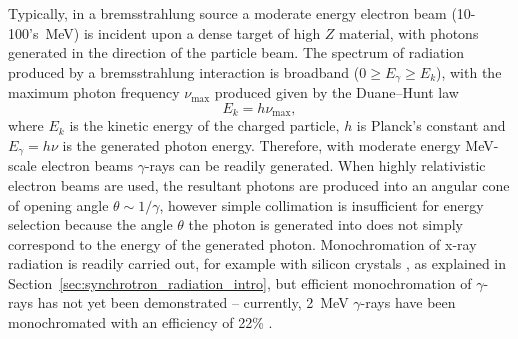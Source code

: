 \documentclass[../main.tex]{subfiles}
\begin{document}
Typically, in a bremsstrahlung source a moderate energy electron beam (10-100's~\si{\mega\electronvolt}) is incident upon a dense target of high $Z$ material, with photons generated in the direction of the particle beam. The spectrum of radiation produced by a bremsstrahlung interaction is broadband ($0 \geq E_{\gamma} \geq E_{k}$), with the maximum photon frequency $\nu_{\mathrm{max}}$ produced given by the Duane--Hunt law \cite{duane1915proceedings}
\begin{equation}
E_{k}=h\nu_{\mathrm{max}},
\label{eq:duane_hunt_intro}
\end{equation}
where $E_{k}$ is the kinetic energy of the charged particle, $h$ is Planck's constant and $E_{\gamma}=h\nu$ is the generated photon energy. Therefore, with moderate energy \si{\mega\electronvolt}-scale electron beams $\gamma$-rays can be readily generated. When highly relativistic electron beams are used, the resultant photons are produced into an angular cone of opening angle $\theta\sim 1/\gamma$, however simple collimation is insufficient for energy selection because the angle $\theta$ the photon is generated into does not simply correspond to the energy of the generated photon. Monochromation of x-ray radiation is readily carried out, for example with silicon crystals , as explained in Section~\ref{sec:synchrotron_radiation_intro}, but efficient monochromation of $\gamma$-rays has not yet been demonstrated -- currently, 2~\si{\mega\electronvolt} $\gamma$-rays have been monochromated with an efficiency of 22\% \cite{jentschel2012gamma}. 
\end{document}
